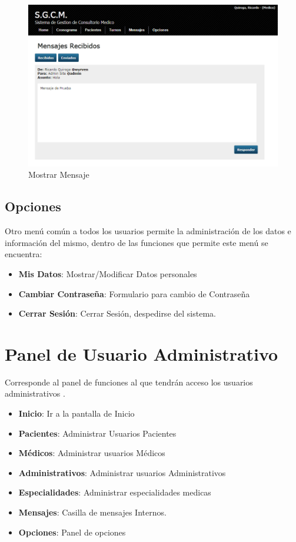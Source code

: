 \begin{figure}[H]
    \centering
    \includegraphics[scale=0.5]{resourse/mensaje-mostrar.png}
    \caption{Mostrar Mensaje}
    \label{fig:612}
\end{figure}

\subsection{Opciones}
Otro menú común a todos los usuarios permite la administración de los datos e información del mismo, dentro de las funciones que permite este menú se encuentra:

\begin{itemize}
    \item \textbf{Mis Datos}: Mostrar/Modificar Datos personales
    \item \textbf{Cambiar Contrase\~na}: Formulario para cambio de Contrase\~na
    \item \textbf{Cerrar Sesión}: Cerrar Sesión, despedirse del sistema.
\end{itemize}


\section{Panel de Usuario Administrativo}

Corresponde al panel de funciones al que tendrán acceso los usuarios administrativos .

\begin{itemize}
    \item \textbf{Inicio}: Ir a la pantalla de Inicio
    \item \textbf{Pacientes}: Administrar Usuarios Pacientes
    \item \textbf{Médicos}: Administrar usuarios Médicos
    \item \textbf{Administrativos}: Administrar usuarios Administrativos
    \item \textbf{Especialidades}: Administrar especialidades medicas
    \item \textbf{Mensajes}: Casilla de mensajes Internos.
    \item \textbf{Opciones}: Panel de opciones
\end{itemize}


